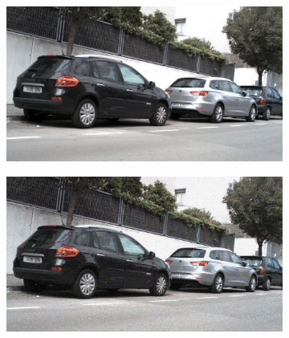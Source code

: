 \documentclass[a4paper]{ctexart}
\begin{document}
\begin{figure}[htbp]
\begin{subfigure}{0.08\textwidth}
				\label{fig：Gamma=0.6, Gauss Noise = 1.0}
			\end{subfigure} \\
			
			\vspace{-15pt}
			
			\begin{subfigure}{0.02\textwidth}
				\captionsetup{font=scriptsize}
				\caption*{}
				\vspace{-2pt}
			\end{subfigure}
			\begin{subfigure}{0.08\textwidth}
				\captionsetup{font=scriptsize}
				\includegraphics[width=\linewidth]{picture/Edge Detection/degrade/RGB_001 Gamma=0.7, Gauss Noise=0.0}
				\label{fig: Gamma=0.7, Gauss Noise = 0.0}
			\end{subfigure}
			\begin{subfigure}{0.08\textwidth}
				\captionsetup{font=scriptsize}
				\includegraphics[width=\linewidth]{picture/Edge Detection/degrade/RGB_001 Gamma=0.7, Gauss Noise=0.1}

\end{subfigure}
\end{figure}
\end{document}
